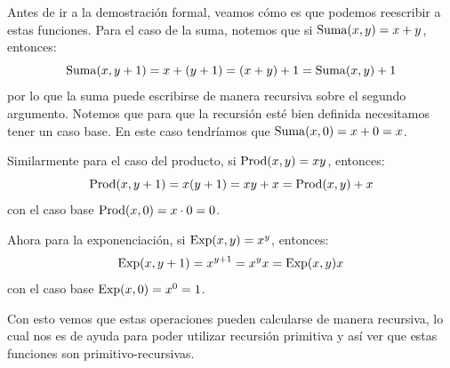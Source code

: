 Antes de ir a la demostración formal, veamos cómo es que podemos reescribir a estas funciones. Para el caso de la suma, notemos que si $\mathrm{Suma}\pa*{x, y} = x + y$, entonces:
\[
	\mathrm{Suma}\pa*{x, y + 1} = x +\pa*{y + 1} =\pa*{x + y} + 1 =\mathrm{Suma}\pa*{x, y} + 1
\]
por lo que la suma puede escribirse de manera recursiva sobre el segundo argumento. Notemos que para que la recursión esté bien definida necesitamos tener un caso base. En este caso tendríamos que $\mathrm{Suma}\pa*{x, 0} = x + 0 = x$.

Similarmente para el caso del producto, si $\mathrm{Prod}\pa*{x, y} = xy$, entonces:
\[
	\mathrm{Prod}\pa*{x, y + 1} = x\pa*{y + 1} = xy + x =\mathrm{Prod}\pa*{x, y} + x
\]
con el caso base $\mathrm{Prod}\pa*{x, 0} = x\cdot 0 = 0$.

Ahora para la exponenciación, si $\mathrm{Exp}\pa*{x, y} = x^{y}$, entonces:
\[
	\mathrm{Exp}\pa*{x, y + 1} = x^{y + 1} = x^{y}x =\mathrm{Exp}\pa*{x, y}x
\]
con el caso base $\mathrm{Exp}\pa*{x, 0} = x^{0} = 1$.

Con esto vemos que estas operaciones pueden calcularse de manera recursiva, lo cual nos es de ayuda para poder utilizar recursión primitiva y así ver que estas funciones son primitivo-recursivas.

